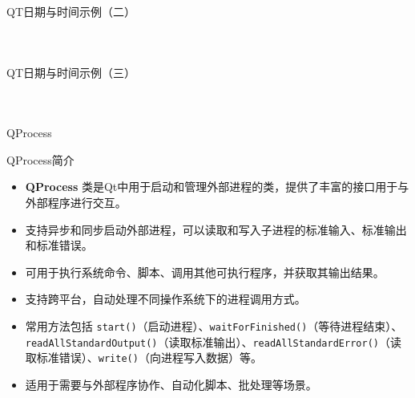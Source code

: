 \documentclass[UTF8,aspectratio=169]{beamer}
\begin{document}
\begin{frame}[fragile]{QT日期与时间示例（二）}
    \begin{columns}
        \begin{column}{0.48\textwidth}
            \inputminted[firstline=33,lastline=45]{cpp}{code/qt_datetime_example.cpp}
        \end{column}
        \begin{column}{0.48\textwidth}
            \inputminted[firstline=46,lastline=62]{cpp}{code/qt_datetime_example.cpp}
        \end{column}
    \end{columns}
\end{frame}

\begin{frame}[fragile]{QT日期与时间示例（三）}
    \begin{columns}
        \begin{column}{0.48\textwidth}
            \inputminted[firstline=63,lastline=82]{cpp}{code/qt_datetime_example.cpp}
        \end{column}
        \begin{column}{0.48\textwidth}
            \inputminted[firstline=83,lastline=97]{cpp}{code/qt_datetime_example.cpp}
        \end{column}
    \end{columns}
\end{frame}

\begin{frame}{QProcess}
    \begin{ytublock}{QProcess简介}
        \begin{itemize}
            \item \textbf{QProcess} 类是Qt中用于启动和管理外部进程的类，提供了丰富的接口用于与外部程序进行交互。
            \item 支持异步和同步启动外部进程，可以读取和写入子进程的标准输入、标准输出和标准错误。
            \item 可用于执行系统命令、脚本、调用其他可执行程序，并获取其输出结果。
            \item 支持跨平台，自动处理不同操作系统下的进程调用方式。
            \item 常用方法包括 \texttt{start()}（启动进程）、\texttt{waitForFinished()}（等待进程结束）、\texttt{readAllStandardOutput()}（读取标准输出）、\texttt{readAllStandardError()}（读取标准错误）、\texttt{write()}（向进程写入数据）等。
            \item 适用于需要与外部程序协作、自动化脚本、批处理等场景。
        \end{itemize}
    \end{ytublock}
\end{frame}
\end{document}

